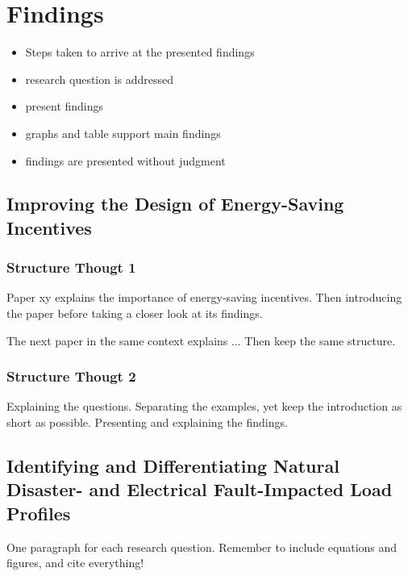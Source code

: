 \chapter{Findings}
\label{cha:findings}

\begin{itemize}
    \item Steps taken to arrive at the presented findings 
    \item research question is addressed
    \item present findings
    \item graphs and table support main findings 
    \item findings are presented without judgment
\end{itemize}

\section{Improving the Design of Energy-Saving Incentives}
\label{sec:improving_the_design_of_energy_saving_incentives}
\subsection*{Structure Thougt 1}
Paper xy explains the importance of energy-saving incentives.
Then introducing the paper before taking a closer look at its findings.

The next paper in the same context explains ...
Then keep the same structure.

\subsection*{Structure Thougt 2}
Explaining the questions.
Separating the examples, yet keep the introduction as short as possible.
Presenting and explaining the findings.

\section{Identifying and Differentiating Natural Disaster- and Electrical Fault-Impacted Load Profiles}
\label{sec:identifying_and_differentiating_natural_disaster_and_electrical_fault_impacted_load_profiles}
One paragraph for each research question.
Remember to include equations and figures, and cite everything!